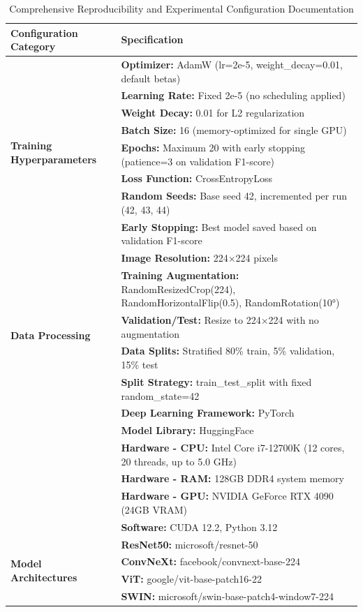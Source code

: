 \documentclass[sn-mathphys]{sn-jnl}
\theoremstyle{thmstyleone}%
\theoremstyle{thmstyletwo}%
\theoremstyle{thmstylethree}%
\begin{document}
\begin{table}[h!]
\centering
\footnotesize
\caption{Comprehensive Reproducibility and Experimental Configuration Documentation}
\label{tab:reproducibility}
\begin{tabular}{@{}p{4cm}p{8cm}@{}}
\toprule
\textbf{Configuration Category} & \textbf{Specification} \\
\midrule
\multirow{8}{*}{\textbf{Training Hyperparameters}} 
& \textbf{Optimizer:} AdamW (lr=2e-5, weight\_decay=0.01, default betas) \\
& \textbf{Learning Rate:} Fixed 2e-5 (no scheduling applied) \\
& \textbf{Weight Decay:} 0.01 for L2 regularization \\
& \textbf{Batch Size:} 16 (memory-optimized for single GPU) \\
& \textbf{Epochs:} Maximum 20 with early stopping (patience=3 on validation F1-score) \\
& \textbf{Loss Function:} CrossEntropyLoss \\
& \textbf{Random Seeds:} Base seed 42, incremented per run (42, 43, 44) \\
& \textbf{Early Stopping:} Best model saved based on validation F1-score \\
\midrule
\multirow{6}{*}{\textbf{Data Processing}} 
& \textbf{Image Resolution:} 224×224 pixels \\
& \textbf{Training Augmentation:} RandomResizedCrop(224), RandomHorizontalFlip(0.5), RandomRotation(10°) \\
& \textbf{Validation/Test:} Resize to 224×224 with no augmentation \\
& \textbf{Data Splits:} Stratified 80\% train, 5\% validation, 15\% test \\
& \textbf{Split Strategy:} train\_test\_split with fixed random\_state=42 \\
\midrule
\multirow{8}{*}{\textbf{Implementation Framework}} 
& \textbf{Deep Learning Framework:} PyTorch \\
& \textbf{Model Library:} HuggingFace \\
& \textbf{Hardware - CPU:} Intel Core i7-12700K (12 cores, 20 threads, up to 5.0 GHz) \\
& \textbf{Hardware - RAM:} 128GB DDR4 system memory \\
& \textbf{Hardware - GPU:} NVIDIA GeForce RTX 4090 (24GB VRAM) \\
& \textbf{Software:} CUDA 12.2, Python 3.12 \\
\midrule
\multirow{4}{*}{\textbf{Model Architectures}} 
& \textbf{ResNet50:} microsoft/resnet-50 \\
& \textbf{ConvNeXt:} facebook/convnext-base-224 \\
& \textbf{ViT:} google/vit-base-patch16-22 \\
& \textbf{SWIN:} microsoft/swin-base-patch4-window7-224 \\
\bottomrule
\end{tabular}
\end{table}
\end{document}
